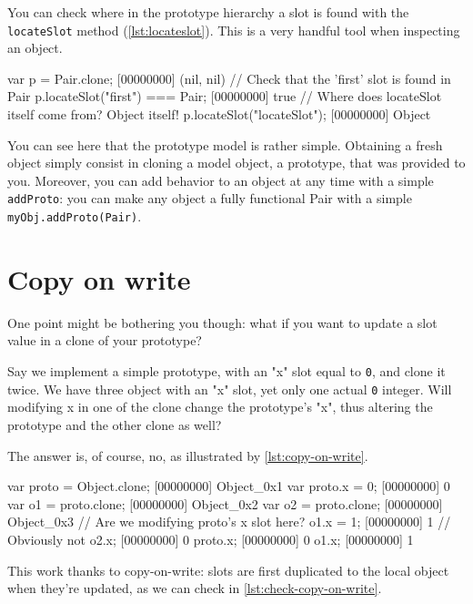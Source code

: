 \documentclass[openright,twoside,12pt]{report}
\begin{document}
You can check where in the prototype hierarchy a slot is found with
the \texttt{locateSlot} method (\autoref{lst:locateslot}). This is a very
handful tool when inspecting an object.

\begin{urbiscript}[caption=Using locateSlot, label=lst:locateslot]
var p = Pair.clone;
[00000000] (nil, nil)
// Check that the 'first' slot is found in Pair
p.locateSlot("first") === Pair;
[00000000] true
// Where does locateSlot itself come from? Object itself!
p.locateSlot("locateSlot");
[00000000] Object
\end{urbiscript}

You can see here that the prototype model is rather simple. Obtaining
a fresh object simply consist in cloning a model object, a prototype,
that was provided to you. Moreover, you can add behavior to an object
at any time with a simple \texttt{addProto}: you can make any object a
fully functional Pair with a simple \lstinline|myObj.addProto(Pair)|.

\section{Copy on write}

One point might be bothering you though: what if you want to update a
slot value in a clone of your prototype?

Say we implement a simple prototype, with an "x" slot equal to
\lstinline|0|, and clone it twice. We have three object with an "x"
slot, yet only one actual \lstinline|0| integer. Will modifying x in
one of the clone change the prototype's "x", thus altering the
prototype and the other clone as well?

The answer is, of course, no, as illustrated by \autoref{lst:copy-on-write}.

\begin{urbiscript}[caption=Copy on write in action,
  label=lst:copy-on-write, name=cow]
var proto = Object.clone;
[00000000] Object_0x1
var proto.x = 0;
[00000000] 0
var o1 = proto.clone;
[00000000] Object_0x2
var o2 = proto.clone;
[00000000] Object_0x3
// Are we modifying proto's x slot here?
o1.x = 1;
[00000000] 1
// Obviously not
o2.x;
[00000000] 0
proto.x;
[00000000] 0
o1.x;
[00000000] 1
\end{urbiscript}

This work thanks to copy-on-write: slots are first duplicated to the
local object when they're updated, as we can check in
\autoref{lst:check-copy-on-write}.
\end{document}
